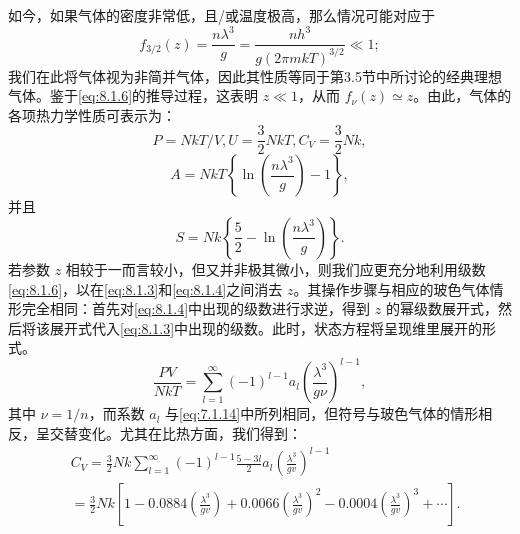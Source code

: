如今，如果气体的密度非常低，且/或温度极高，那么情况可能对应于
\begin{equation}\tag{8.1.13}\label{eq:8.1.13}
f _ { 3 / 2 } ( z ) = \frac { n \lambda ^{3} } { g } = \frac { n h ^{3} } { g ( 2 \pi m k T ) ^{3 / 2} } \ll 1 ;
\end{equation}
我们在此将气体视为非简并气体，因此其性质等同于第3.5节中所讨论的经典理想气体。鉴于\autoref{eq:8.1.6}的推导过程，这表明 \(z \ll 1\)，从而 \(f_{\nu}(z) \simeq z\)。由此，气体的各项热力学性质可表示为：
\begin{equation}\tag{8.1.14}\label{eq:8.1.14}
P = N k T / V ,  U = \frac { 3 } { 2 } N k T ,  C _ { V } = \frac { 3 } { 2 } N k ,
\end{equation}
\begin{equation}\tag{8.1.15}\label{eq:8.1.15}
A = N k T \left\{ \ln \left( \frac { n \lambda ^{3} } { g } \right) - 1 \right\} ,
\end{equation}
并且
\begin{equation}\tag{8.1.16}\label{eq:8.1.16}
S = N k \left\{ \frac { 5 } { 2 } - \ln \left( \frac { n \lambda ^{3} } { g } \right) \right\} .
\end{equation}
若参数 \(z\) 相较于一而言较小，但又并非极其微小，则我们应更充分地利用级数\autoref{eq:8.1.6}，以在\autoref{eq:8.1.3}和\autoref{eq:8.1.4}之间消去 \(z\)。其操作步骤与相应的玻色气体情形完全相同：首先对\autoref{eq:8.1.4}中出现的级数进行求逆，得到 \(z\) 的幂级数展开式，然后将该展开式代入\autoref{eq:8.1.3}中出现的级数。此时，状态方程将呈现维里展开的形式。
\begin{equation}\tag{8.1.17}\label{eq:8.1.17}
\frac { P V } { N k T } = \sum _ { l = 1 } ^{\infty} ( - 1 ) ^{l - 1} a _ { l } \left( \frac { \lambda ^{3} } { g \nu } \right) ^{l - 1} ,
\end{equation}
其中 \(\nu=1/n\)，而系数 \(a_{l}\) 与\autoref{eq:7.1.14}中所列相同，但符号与玻色气体的情形相反，呈交替变化。尤其在比热方面，我们得到：
\begin{equation}\tag{8.1.18}\label{eq:8.1.18}
\begin{array}{rl} & { C _ { V } = \frac { 3 } { 2 } N k \sum _ { l = 1 } ^{\infty} ( - 1 ) ^{l - 1} \frac { 5 - 3 l } { 2 } a _ { l } \left( \frac { \lambda ^{3} } { g v } \right) ^{l - 1} } \\& { = \frac { 3 } { 2 } N k \left[ 1 - 0 . 08 84 \left( \frac { \lambda ^{3} } { g v } \right) + 0 . 00 66 \left( \frac { \lambda ^{3} } { g v } \right) ^{2} - 0 . 00 04 \left( \frac { \lambda ^{3} } { g v } \right) ^{3} + \cdots \right] . } \end{array}
\end{equation}

